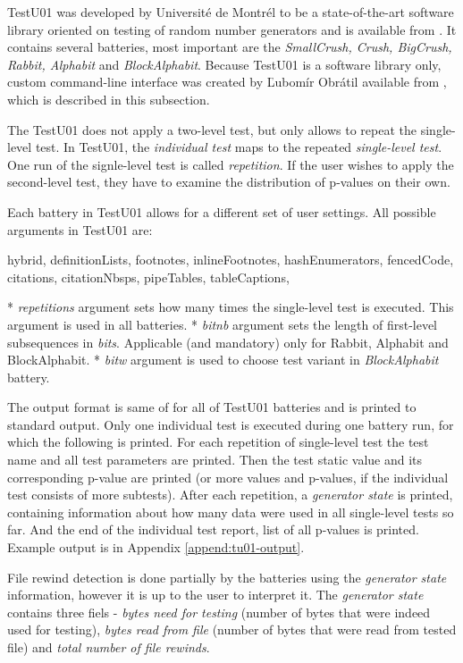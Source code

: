 \documentclass[
  digital,     %
  oneside,     %
  nosansbold,  %
  nocolorbold, %
  nolof,         %
  nolot,         %
]{fithesis4}
\begin{document}
TestU01 was developed by Université de Montrél to be a state-of-the-art software library oriented on testing of random number generators \cite{tu01_paper} and is available from \cite{tu01_site}. It contains several batteries, most important are the \emph{SmallCrush, Crush, BigCrush, Rabbit, Alphabit} and \emph{BlockAlphabit}. Because TestU01 is a software library only, custom command-line interface was created by Ľubomír Obrátil available from \cite{rtt-batteries}, which is described in this subsection.

The TestU01 does not apply a two-level test, but only allows to repeat the single-level test. In TestU01, the \emph{individual test} maps to the repeated \emph{single-level test}. One run of the signle-level test is called \emph{repetition}. If the user wishes to apply the second-level test, they have to examine the distribution of p-values on their own.

Each battery in TestU01 allows for a different set of user settings. All possible arguments in TestU01 are:
\begin{markdown*}{%
  hybrid,
  definitionLists,
  footnotes,
  inlineFootnotes,
  hashEnumerators,
  fencedCode,
  citations,
  citationNbsps,
  pipeTables,
  tableCaptions,
}

* \emph{repetitions} argument sets how many times the single-level test is executed. This argument is used in all batteries.
* \emph{bit\textunderscore nb} argument sets the length of first-level subsequences in \emph{bits}. Applicable (and mandatory) only for Rabbit, Alphabit and BlockAlphabit.
* \emph{bit\textunderscore w} argument is used to choose test variant in \emph{BlockAlphabit} battery.
\end{markdown*}

The output format is same of for all of TestU01 batteries and is printed to standard output. Only one individual test is executed during one battery run, for which the following is printed. For each repetition of single-level test the test name and all test parameters are printed. Then the test static value and its corresponding p-value are printed (or more values and p-values, if the individual test consists of more subtests). After each repetition, a \emph{generator state} is printed, containing information about how many data were used in all single-level tests so far. And the end of the individual test report, list of all p-values is printed. Example output is in Appendix \ref{append:tu01-output}.

File rewind detection is done partially by the batteries using the \emph{generator state} information, however it is up to the user to interpret it. The \emph{generator state} contains three fiels - \emph{bytes need for testing} (number of bytes that were indeed used for testing), \emph{bytes read from file} (number of bytes that were read from tested file) and \emph{total number of file rewinds}. 
\end{document}
